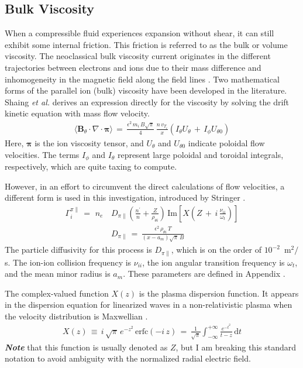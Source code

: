 \subsection{Bulk Viscosity}\label{ssec:bulk_viscosity}
When a compressible fluid experiences expansion without shear, it can still exhibit some internal friction.
This friction is referred to as the bulk or volume viscosity.
The neoclassical bulk viscosity current originates in the different trajectories between electrons and ions due to their mass difference and inhomogeneity in the magnetic field along the field lines \cite{kobayashi_model_2017}.
Two mathematical forms of the parallel ion (bulk) viscosity have been developed in the literature.
Shaing \emph{et al.} \cite{shaing_bifurcation_1990} derives an expression directly for the viscosity by solving the drift kinetic equation with mass flow velocity.
\begin{align}%
	\langle \mathbf{B}_\theta \cdot \nabla \cdot \boldsymbol{\pi} \rangle \,=\,
		\frac{\epsilon^2 \, m_i \, B \sqrt{\pi}}{4} \, \frac{n\,v_{T_i}}{x}
		\left(I_\theta U_\theta \,+\, I_\phi U_{\theta 0}\right)
		\label{eq:shaing_bulk}
\end{align}
Here, $\boldsymbol{\pi}$ is the ion viscosity tensor, and $U_\theta$ and $U_{\theta 0}$ indicate poloidal flow velocities.
The terms $I_\phi$ and $I_\theta$ represent large poloidal and toroidal integrals, respectively, which are quite taxing to compute.

However, in an effort to circumvent the direct calculations of flow velocities, a different form is used in this investigation, introduced by Stringer \cite{stringer_explanation_1993}.
\begin{align} %
	\Gamma_i^{\pi\parallel} \,=\, \,n_e\,&D_{\pi\parallel}
		\left(\frac{n^\prime}{n} + \frac{Z}{\rho_{\theta i}}\right) \,
		\text{Im}\left[X\left(Z \,+\, i\,\frac{\nu_{ii}}{\omega_t}\right)\right]
		\label{eq:stringer_Gamma_bulk} \\
	&D_{\pi\parallel} \,=\, \frac{\epsilon^2\,\rho_{\theta i}\,T}
		{(x - a_m)\sqrt{\pi}\,B} \label{eq:stringer_D_bulk}
\end{align}
The particle diffusivity for this process is $D_{\pi\parallel}$, which is on the order of $10^{-2}$~m$^2 / $s.
The ion-ion collision frequency is $\nu_{ii}$, the ion angular transition frequency is $\omega_t$, and the mean minor radius is $a_m$.
These parameters are defined in Appendix .

The complex-valued function $X(z)$ is the plasma dispersion function.
It appears in the dispersion equation for linearized waves in a non-relativistic plasma when the velocity distribution is Maxwellian \cite{fried_plasma_2015}.
\begin{align} %
	X(z) \,\equiv\, i\,\sqrt{\pi} \, e^{-z^2} \, \text{erfc}(-i\,z) \,=\,
		\frac{1}{\sqrt{\pi}} \int_{-\infty}^{+\infty} \frac{e^{-t^2}}{t - z}
		\, \text{d}t \label{eq:plasma_disp}
\end{align}
\emph{\textbf{Note}} that this function is usually denoted as $Z$, but I am breaking this standard notation to avoid ambiguity with the normalized radial electric field.

